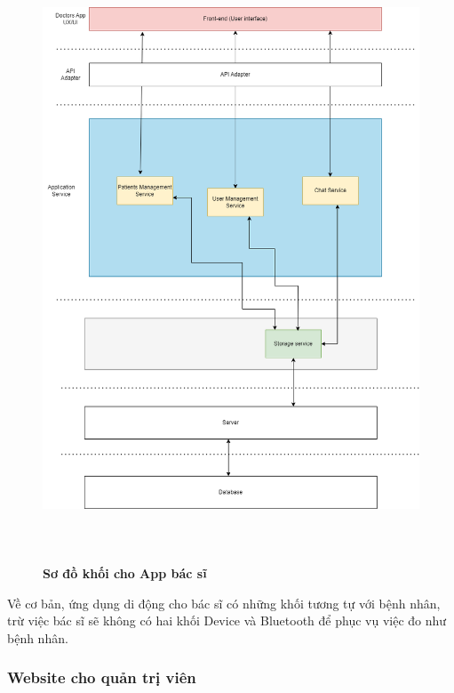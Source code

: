 \begin{figure}[H]
  \centering
  \includegraphics[width=16cm,height=18cm]{Images/system/fmECG_architecture-Doctors.drawio.png}
  \caption[Sơ đồ khói cho App bác sĩ]{\bfseries \fontsize{12pt}{0pt}\selectfont Sơ đồ khối cho App bác sĩ}
  \label{fmECG_architecture-Doctors} %
\end{figure}

Về cơ bản, ứng dụng di động cho bác sĩ có những khối tương tự với bệnh nhân, trừ việc bác sĩ sẽ không có hai khối Device
và Bluetooth để phục vụ việc đo như bệnh nhân.


\subsubsection{Website cho quản trị viên}

